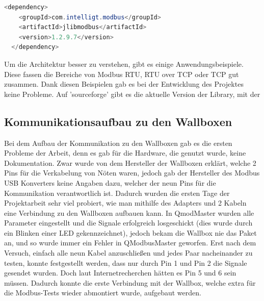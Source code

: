  \begin{lstlisting}[language=java,caption=Dependency in Pom.xml,label=lst:impl:foo]
    <dependency> 
    <groupId>com.intelligt.modbus</groupId> 
    <artifactId>jlibmodbus</artifactId> 
    <version>1.2.9.7</version> 
  </dependency> 
\end{lstlisting}


Um die Architektur besser zu verstehen, gibt es einige Anwendungsbeispiele. Diese fassen die Bereiche von Modbus RTU, RTU over TCP oder TCP gut zusammen. Dank diesen Beispielen gab es bei der Entwicklung des Projektes keine Probleme. Auf 'sourceforge' gibt es die aktuelle Version der Library, mit der 

\subsection{Kommunikationsaufbau zu den Wallboxen }

Bei dem Aufbau der Kommunikation zu den Wallboxen gab es die ersten Probleme der Arbeit, denn es gab für die Hardware, die genutzt wurde, keine Dokumentation. Zwar wurde von dem Hersteller der Wallboxen erklärt, welche 2 Pins für die Verkabelung von Nöten waren, jedoch gab der Hersteller des Modbus USB Konverters keine Angaben dazu, welcher der neun Pins für die Kommunikation verantwortlich ist. Dadurch wurden die ersten Tage der Projektarbeit sehr viel probiert, wie man mithilfe des Adapters und 2 Kabeln eine Verbindung zu den Wallboxen aufbauen kann. In QmodMaster wurden alle Parameter eingestellt und die Signale erfolgreich losgeschickt (dies wurde durch ein Blinken einer LED gekennzeichnet), jedoch bekam die Wallbox nie das Paket an, und so wurde immer ein Fehler in QModbusMaster geworfen. Erst nach dem Versuch, einfach alle neun Kabel anzuschließen und jedes Paar nacheinander zu testen, konnte festgestellt werden, dass nur durch Pin 1 und Pin 2 die Signale gesendet wurden. Doch laut Internetrecherchen hätten es Pin 5 und 6 sein müssen. Dadurch konnte die erste Verbindung mit der Wallbox, welche extra für die Modbus-Tests wieder abmontiert wurde, aufgebaut werden.   

 

